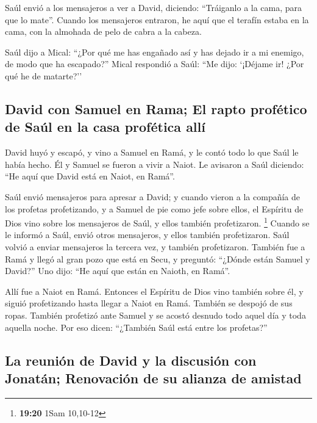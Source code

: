  Saúl envió a los mensajeros a ver a David, diciendo:
``Tráiganlo a la cama, para que lo mate''.  Cuando los
mensajeros entraron, he aquí que el terafín estaba en la cama, con la
almohada de pelo de cabra a la cabeza.

 Saúl dijo a Mical: ``¿Por qué me has engañado así y has
dejado ir a mi enemigo, de modo que ha escapado?'' Mical respondió a
Saúl: ``Me dijo: `¡Déjame ir! ¿Por qué he de matarte?''

\hypertarget{david-con-samuel-en-rama-el-rapto-profuxe9tico-de-sauxfal-en-la-casa-profuxe9tica-alluxed}{%
\subsection{David con Samuel en Rama; El rapto profético de Saúl en la
casa profética
allí}\label{david-con-samuel-en-rama-el-rapto-profuxe9tico-de-sauxfal-en-la-casa-profuxe9tica-alluxed}}

 David huyó y escapó, y vino a Samuel en Ramá, y le contó
todo lo que Saúl le había hecho. Él y Samuel se fueron a vivir a Naiot.
 Le avisaron a Saúl diciendo: ``He aquí que David está en
Naiot, en Ramá''.

 Saúl envió mensajeros para apresar a David; y cuando
vieron a la compañía de los profetas profetizando, y a Samuel de pie
como jefe sobre ellos, el Espíritu de Dios vino sobre los mensajeros de
Saúl, y ellos también profetizaron. \footnote{\textbf{19:20} 1Sam
  10,10-12}  Cuando se le informó a Saúl, envió otros
mensajeros, y ellos también profetizaron. Saúl volvió a enviar
mensajeros la tercera vez, y también profetizaron. 
También fue a Ramá y llegó al gran pozo que está en Secu, y preguntó:
``¿Dónde están Samuel y David?'' Uno dijo: ``He aquí que están en
Naioth, en Ramá''.

 Allí fue a Naiot en Ramá. Entonces el Espíritu de Dios
vino también sobre él, y siguió profetizando hasta llegar a Naiot en
Ramá.  También se despojó de sus ropas. También profetizó
ante Samuel y se acostó desnudo todo aquel día y toda aquella noche. Por
eso dicen: ``¿También Saúl está entre los profetas?''

\hypertarget{la-reuniuxf3n-de-david-y-la-discusiuxf3n-con-jonatuxe1n-renovaciuxf3n-de-su-alianza-de-amistad}{%
\subsection{La reunión de David y la discusión con Jonatán; Renovación
de su alianza de
amistad}\label{la-reuniuxf3n-de-david-y-la-discusiuxf3n-con-jonatuxe1n-renovaciuxf3n-de-su-alianza-de-amistad}}

